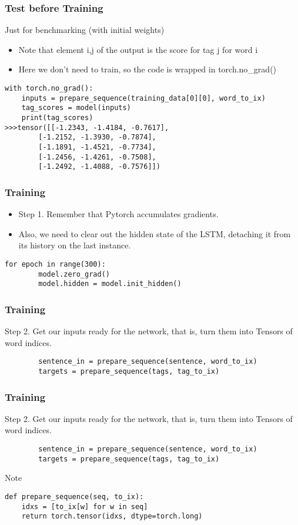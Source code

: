 \begin{frame}[fragile]
\frametitle{Test before Training}
Just for benchmarking (with initial weights)
\begin{itemize}
\item Note that element i,j of the output is the score for tag j for word i
\item Here we don't need to train, so the code is wrapped in torch.no\_grad()
\end{itemize}
\begin{lstlisting}
with torch.no_grad():
    inputs = prepare_sequence(training_data[0][0], word_to_ix)
    tag_scores = model(inputs)
    print(tag_scores)
>>>tensor([[-1.2343, -1.4184, -0.7617],
        [-1.2152, -1.3930, -0.7874],
        [-1.1891, -1.4521, -0.7734],
        [-1.2456, -1.4261, -0.7508],
        [-1.2492, -1.4088, -0.7576]])	
\end{lstlisting}      
\end{frame} 

\begin{frame}[fragile]
\frametitle{Training}
\begin{itemize}
\item Step 1. Remember that Pytorch accumulates gradients. 
\item Also, we need to clear out the hidden state of the LSTM, detaching it from its history on the last instance.
\end{itemize}
\begin{lstlisting}
for epoch in range(300):
        model.zero_grad()
        model.hidden = model.init_hidden()
\end{lstlisting}      
\end{frame} 

\begin{frame}[fragile]
\frametitle{Training}
Step 2. Get our inputs ready for the network, that is, turn them into Tensors of word indices.
\begin{lstlisting}
        sentence_in = prepare_sequence(sentence, word_to_ix)
        targets = prepare_sequence(tags, tag_to_ix)
\end{lstlisting}      
\end{frame} 

\begin{frame}[fragile]
\frametitle{Training}
Step 2. Get our inputs ready for the network, that is, turn them into Tensors of word indices.
\begin{lstlisting}
        sentence_in = prepare_sequence(sentence, word_to_ix)
        targets = prepare_sequence(tags, tag_to_ix)
\end{lstlisting}     
Note
\begin{lstlisting}
def prepare_sequence(seq, to_ix):
    idxs = [to_ix[w] for w in seq]
    return torch.tensor(idxs, dtype=torch.long)
\end{lstlisting}      
\end{frame} 

